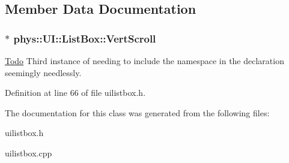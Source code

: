 \subsection{Member Data Documentation}
\hypertarget{classphys_1_1UI_1_1ListBox_ab2b012b345ff4bb1a5b228fef88d895c}{
\subsubsection[{VertScroll}]{$\ast$ {\bf phys::UI::ListBox::VertScroll}}}
\label{d0/d28/classphys_1_1UI_1_1ListBox_ab2b012b345ff4bb1a5b228fef88d895c}
\begin{Desc}
\item[\hyperlink{todo__todo000024}{Todo}]Third instance of needing to include the namespace in the declaration seemingly needlessly. \end{Desc}


Definition at line 66 of file uilistbox.h.



The documentation for this class was generated from the following files:\begin{DoxyCompactItemize}
\item 
uilistbox.h\item 
uilistbox.cpp\end{DoxyCompactItemize}
